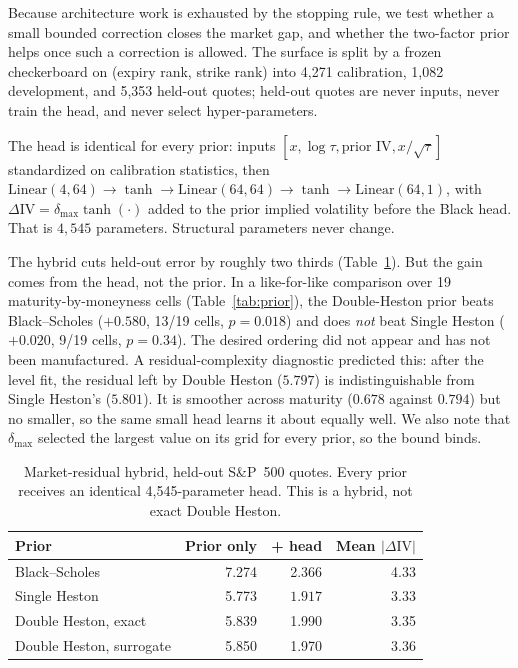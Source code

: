 \documentclass[conference]{IEEEtran}
\begin{document}
Because architecture work is exhausted by the stopping rule, we test whether a
small bounded correction closes the market gap, and whether the two-factor
prior helps once such a correction is allowed. The surface is split by a frozen
checkerboard on (expiry rank, strike rank) into 4,271 calibration, 1,082
development, and 5,353 held-out quotes; held-out quotes are never inputs, never
train the head, and never select hyper-parameters.

The head is identical for every prior: inputs
$[x,\log\tau,\text{prior IV},x/\sqrt{\tau}]$ standardized on calibration
statistics, then $\mathrm{Linear}(4,64)\to\tanh\to\mathrm{Linear}(64,64)\to
\tanh\to\mathrm{Linear}(64,1)$, with
$\Delta\mathrm{IV}=\delta_{\max}\tanh(\cdot)$ added to the prior implied
volatility before the Black head. That is $4{,}545$ parameters. Structural
parameters never change.

The hybrid cuts held-out error by roughly two thirds
(Table~\ref{tab:hybrid}). But the gain comes from the head, not the prior. In a
like-for-like comparison over 19 maturity-by-moneyness cells
(Table~\ref{tab:prior}), the Double-Heston prior beats Black--Scholes
($+0.580$, 13/19 cells, $p=0.018$) and does \emph{not} beat Single Heston
($+0.020$, 9/19 cells, $p=0.34$). The desired ordering did not appear and has
not been manufactured. A residual-complexity diagnostic predicted this: after
the level fit, the residual left by Double Heston ($5.797$) is
indistinguishable from Single Heston's ($5.801$). It is smoother across
maturity ($0.678$ against $0.794$) but no smaller, so the same small head
learns it about equally well. We also note that $\delta_{\max}$ selected the
largest value on its grid for every prior, so the bound binds.

\begin{table}[!t]
\centering
\caption{Market-residual hybrid, held-out S\&P~500 quotes. Every prior receives
an identical 4,545-parameter head. This is a hybrid, not exact Double Heston.}
\label{tab:hybrid}
\begin{tabular}{lrrr}
\toprule
Prior & Prior only & + head & Mean $|\Delta\mathrm{IV}|$ \\
\midrule
Black--Scholes & 7.274 & 2.366 & 4.33 \\
Single Heston & 5.773 & $\mathbf{1.917}$ & 3.33 \\
Double Heston, exact & 5.839 & 1.990 & 3.35 \\
Double Heston, surrogate & 5.850 & 1.970 & 3.36 \\
\bottomrule
\end{tabular}
\end{table}
\end{document}
